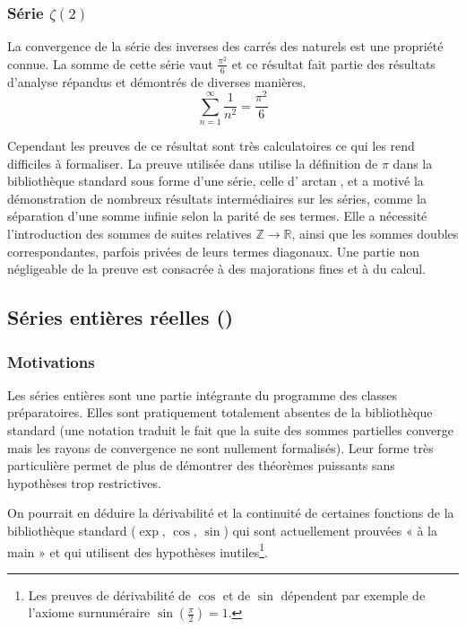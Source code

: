 \subsubsection{Série $\zeta(2)$}

La convergence de la série des inverses des carrés des naturels est une propriété connue. La somme de cette série vaut $\frac{\pi^2}6$ et ce résultat fait partie des résultats d'analyse répandus et démontrés de diverses manières.
\[\sum_{n=1}^{\infty}{\frac1{n^2}} = \frac{\pi^2}6\]

Cependant les preuves de ce résultat sont très calculatoires ce qui les rend difficiles à formaliser. La preuve utilisée dans  utilise la définition de $\pi$ dans la bibliothèque standard sous forme d'une série, celle d'$\arctan$, et a motivé la démonstration de nombreux résultats intermédiaires sur les séries, comme la séparation d'une somme infinie selon la parité de ses termes. Elle a nécessité l'introduction des sommes de suites relatives $\mathbb{Z}\rightarrow\mathbb{R}$, ainsi que les sommes doubles correspondantes, parfois privées de leurs termes diagonaux. Une partie non négligeable de la preuve est consacrée à des majorations fines et à du calcul.

\subsection{Séries entières réelles ()}

\subsubsection{Motivations}

Les séries entières sont une partie intégrante du programme des classes préparatoires. Elles sont pratiquement totalement absentes de la bibliothèque standard (une notation  traduit le fait que la suite des sommes partielles converge mais les rayons de convergence ne sont nullement formalisés). Leur forme très particulière permet de plus de démontrer des théorèmes puissants sans hypothèses trop restrictives.

On pourrait en déduire la dérivabilité et la continuité de certaines fonctions de la bibliothèque standard ($\exp$, $\cos$, $\sin$) qui sont actuellement prouvées « à la main » et qui utilisent des hypothèses inutiles\footnote{Les preuves de dérivabilité de $\cos$ et de $\sin$ dépendent par exemple de l'axiome surnuméraire $\sin\left(\frac{\pi}{2}\right) = 1$.}.

